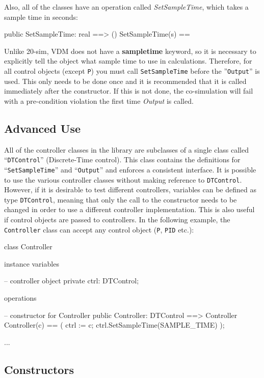 \documentclass{crescendorepchap}
\begin{document}
Also, all of the classes have an operation called \emph{SetSampleTime},
which takes a sample time in seconds:

\begin{vdmrt}
public SetSampleTime: real ==> ()
SetSampleTime(s) ==
\end{vdmrt}

Unlike 20-sim, VDM does not have a \textbf{sampletime} keyword, so it is
necessary to explicitly tell the object what sample time to use in
calculations. Therefore, for all control objects (except \texttt{P}) you must
call \texttt{SetSampleTime} before the ''\texttt{Output}'' is used. This only needs
to be done once and it is recommended that it is called immediately
after the constructor. If this is not done, the co-simulation will fail
with a pre-condition violation the first time \emph{Output} is called.

\subsection{Advanced Use}

All of the controller classes in the library are subclasses of a single
class called ``\texttt{DTControl}'' (Discrete-Time control). This class contains
the definitions for ``\texttt{SetSampleTime}'' and ``\texttt{Output}'' and enforces a
consistent interface. It is possible to use the various controller
classes without making reference to \texttt{DTControl}. However, if it is
desirable to test different controllers, variables can be defined as
type \texttt{DTControl}, meaning that only the call to the constructor
needs to be changed in order to use a different controller
implementation. This is also useful if control objects are passed to
controllers. In the following example, the \texttt{Controller} class can
accept any control object (\texttt{P}, \texttt{PID} etc.):

\begin{vdmrt}
class Controller

instance variables

-- controller object
private ctrl: DTControl;

operations

-- constructor for Controller
public Controller: DTControl ==> Controller
Controller(c) ==
(
ctrl := c;
ctrl.SetSampleTime(SAMPLE_TIME)
);

...
\end{vdmrt}

\subsection{Constructors}
\end{document}
